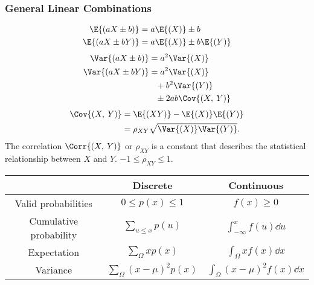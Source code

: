 \documentclass{article}
\begin{document}
\begin{minipage}{126.1962963mm}
\begin{multicols}{2}
        \subsubsection*{General Linear Combinations}
        \begin{align*}
            \E{\left( aX\pm b \right)}  & = a\E{\left( X \right)} \pm b                     \\
            \E{\left( aX\pm bY \right)} & = a\E{\left( X \right)} \pm b\E{\left( Y \right)}
        \end{align*}
        \begin{align*}
            \Var{\left( aX\pm b \right)} & = a^2\Var{\left( X \right)}                  \\
            \Var{\left( aX\pm bY \right)}   & = a^2\Var{\left( X \right)}                  \\
                                         & \phantom{=} + b^2\Var{\left( Y \right)}      \\
                                         & \phantom{=} \pm 2ab\Cov{\left( X,\: Y \right)}
        \end{align*}
        \begin{align*}
            \Cov{\left( X,\: Y \right)} & = \E{\left( XY \right)} - \E{\left( X \right)}\E{\left( Y \right)} \\
                                        & = \rho_{XY} \sqrt{\Var{\left( X \right)}\Var{\left( Y \right)}}.
        \end{align*}
        The correlation $\Corr{\left( X,\: Y \right)}$ or $\rho_{XY}$ is a constant that describes the statistical relationship
        between $X$ and $Y$. $-1 \leq \rho_{XY} \leq 1$.
    \end{multicols}
    \begin{table}[H]
        \centering
        \begin{tabular}{c | c | c}
            \toprule
                                   & \textbf{Discrete}                            & \textbf{Continuous}                                \\
            \midrule
            Valid probabilities    & $0 \leq p(x) \leq 1$                         & $f(x) \geq 0$                                      \\
            Cumulative probability & $\sum_{u \leq x} p(u)$                       & $\int_{-\infty}^{x} f(u) \dd{u}$                   \\
            Expectation            & $\sum_{\Omega} xp(x)$                        & $\int_{\Omega} xf(x)\dd{x}$                        \\
            Variance               & $\sum_{\Omega} \left( x - \mu \right)^2p(x)$ & $\int_{\Omega} \left( x - \mu \right)^2f(x)\dd{x}$ \\
            \bottomrule
        \end{tabular}
    \end{table}
\end{minipage}\hfill%
\end{document}
